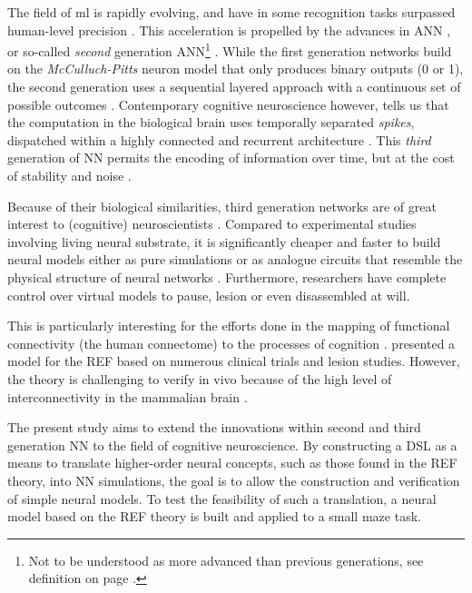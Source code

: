 \documentclass[report.tex]{subfiles}
\begin{document}
The field of \gls{ml} is rapidly evolving, and have in
some recognition tasks surpassed human-level precision
\autocite{Schmidhuber2014}.
This acceleration is propelled by the advances in \gls{ANN}
\autocite{Rumelhart1988, Schmidhuber2014, Nilsson2009}, or
so-called \textit{second} generation \gls{ANN}\footnote{Not to be 
understood as more advanced than previous generations, see definition on page
\pageref{sec:glossary}.} \cite{Maass1997}.
While the first generation networks build on the \textit{McCulluch-Pitts}
neuron model that only produces binary outputs (0 or 1), the second
generation uses a sequential layered approach with a continuous set of 
possible outcomes \cite{Maass1997, Russel2007}.
Contemporary cognitive neuroscience however, tells us that the computation
in the biological brain uses temporally separated \textit{spikes}, 
dispatched within a highly connected and recurrent architecture 
\cite{Dayan2001, Eliasmith2004}.
This \textit{third} generation of \gls{NN} permits the encoding
of information over time, but at the cost of stability and 
noise \autocite{Maass1997}.

Because of their biological similarities, third generation 
networks are of great interest to (cognitive) neuroscientists
\autocite{Dayan2001,Bruderle2011,Eliasmith2015}.
Compared to experimental studies involving living neural substrate,
it is significantly cheaper and faster to build neural 
models either as pure simulations
\autocite{Davison2009, Eliasmith2015} or as analogue circuits
that resemble the physical structure of neural networks
\autocite{Walter2015, Schmitt2017}.
Furthermore, researchers have complete control over virtual models
to pause, lesion or even disassembled at will.

This is particularly interesting for the efforts done in the
mapping of functional connectivity (the human connectome) to the
processes of cognition \autocite{Eliasmith2015, Mogensen2011}. 
\textcite{Mogensen2011} presented a model for the 
\gls{REF} based on numerous clinical trials and lesion studies.
However, the theory is challenging to verify in vivo because of
the high level of interconnectivity in the mammalian brain
\autocite{Hohwy2009, Mogensen2017}.

The present study aims to extend the innovations within
second and third generation \gls{NN} to the field of
cognitive  neuroscience. 
By constructing a \gls{DSL} as a means to translate higher-order
neural concepts, such as those found in the \gls{REF} theory, 
into \gls{NN} simulations, the goal is to allow
the construction and verification of simple neural models.
To test the feasibility of such a translation, a neural model
based on the \gls{REF} theory is built and applied to a small maze task.
\end{document}
